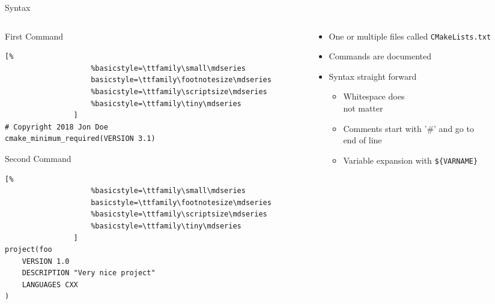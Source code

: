 \documentclass[t]{beamer}
\begin{document}
\begin{frame}[fragile]{Syntax}
    \begin{columns}[T]
        \begin{column}{0.6\textwidth}
            \begin{block}{First Command}
                \begin{lstlisting}[%
                    %basicstyle=\ttfamily\small\mdseries
                    basicstyle=\ttfamily\footnotesize\mdseries
                    %basicstyle=\ttfamily\scriptsize\mdseries
                    %basicstyle=\ttfamily\tiny\mdseries
                ]
# Copyright 2018 Jon Doe
cmake_minimum_required(VERSION 3.1)
                \end{lstlisting}
            \end{block}

            \begin{block}{Second Command}
                \begin{lstlisting}[%
                    %basicstyle=\ttfamily\small\mdseries
                    basicstyle=\ttfamily\footnotesize\mdseries
                    %basicstyle=\ttfamily\scriptsize\mdseries
                    %basicstyle=\ttfamily\tiny\mdseries
                ]
project(foo
    VERSION 1.0
    DESCRIPTION "Very nice project"
    LANGUAGES CXX
)
                \end{lstlisting}
            \end{block}

        \end{column}

        \begin{column}{0.4\textwidth}
            \begin{itemize}
                \item One or multiple files called \texttt{CMakeLists.txt}
                \item Commands are documented
                \item Syntax straight forward
                    \begin{itemize}
                        \item Whitespace does\\not matter
                        \item Comments start with '\#' and go to\\end of
                            line
                        \item Variable expansion with
                            \texttt{\$\{VARNAME\}}
                    \end{itemize}
            \end{itemize}
        \end{column}
    \end{columns}


\end{frame}
\end{document}
